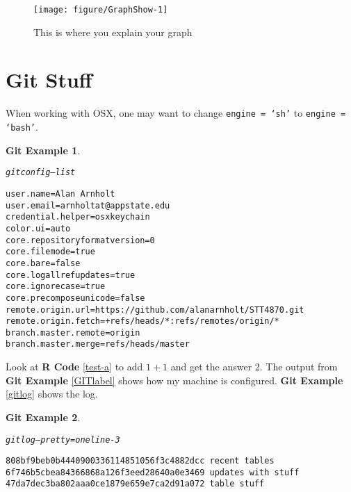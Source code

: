 \documentclass{article}\usepackage[]{graphicx}\usepackage[]{color}
\makeatletter
\newenvironment{kframe}{%
 \def\at@end@of@kframe{}%
 \ifinner\ifhmode%
  \def\at@end@of@kframe{\end{minipage}}%
  \begin{minipage}{\columnwidth}%
 \fi\fi%
 \def\FrameCommand##1{\hskip\@totalleftmargin \hskip-\fboxsep
 \colorbox{shadecolor}{##1}\hskip-\fboxsep
     \hskip-\linewidth \hskip-\@totalleftmargin \hskip\columnwidth}%
 \MakeFramed {\advance\hsize-\width
   \@totalleftmargin\z@ \linewidth\hsize
   \@setminipage}}%
 {\par\unskip\endMakeFramed%
 \at@end@of@kframe}
\newenvironment{knitrout}{}{} %
\theoremstyle{rcode}
\newtheorem{GIT}{Git Example}[section]
\makeatother
\begin{document}
\begin{figure}[h]
\begin{knitrout}
\color{fgcolor}

{\centering \texttt{[image: figure/GraphShow-1]} 

}



\end{knitrout}
\caption{This is where you explain your graph \label{graphDude}}
\end{figure}

\clearpage

\section{Git Stuff}

When working with OSX, one may want to change \texttt{engine = `sh'} to \texttt{engine = `bash'}.

\begin{knitrout}
\color{fgcolor}\begin{kframe}
\begin{GIT}\label{GITlabel}\hfill{}\begin{alltt}
git config --list
\end{alltt}

\begin{verbatim}
user.name=Alan Arnholt
user.email=arnholtat@appstate.edu
credential.helper=osxkeychain
color.ui=auto
core.repositoryformatversion=0
core.filemode=true
core.bare=false
core.logallrefupdates=true
core.ignorecase=true
core.precomposeunicode=false
remote.origin.url=https://github.com/alanarnholt/STT4870.git
remote.origin.fetch=+refs/heads/*:refs/remotes/origin/*
branch.master.remote=origin
branch.master.merge=refs/heads/master
\end{verbatim}
\end{GIT}\end{kframe}
\end{knitrout}

Look at \textbf{R Code} \vref{test-a} to add $1 + 1$ and get the answer 2. The output from \textbf{Git Example} \vref{GITlabel} shows how my machine is configured. \textbf{Git Example} \vref{gitlog} shows the log.

\begin{knitrout}
\color{fgcolor}\begin{kframe}
\begin{GIT}\label{gitlog}\hfill{}\begin{alltt}
git log --pretty=oneline -3
\end{alltt}

\begin{verbatim}
808bf9beb0b4440900336114851056f3c4882dcc recent tables
6f746b5cbea84366868a126f3eed28640a0e3469 updates with stuff
47da7dec3ba802aaa0ce1879e659e7ca2d91a072 table stuff
\end{verbatim}
\end{GIT}\end{kframe}
\end{knitrout}
\end{document}
